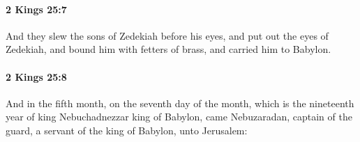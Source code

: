 		\paragraph{2 Kings 25:7} %
			\label{2KINGS-25-7}

			And they slew the sons of Zedekiah before his eyes, and put out the eyes of Zedekiah, and bound him with fetters of brass, and carried him to Babylon.


		\paragraph{2 Kings 25:8} %
			\label{2KINGS-25-8}

			And in the fifth month, on the seventh day of the month, which is the nineteenth year of king Nebuchadnezzar king of Babylon, came Nebuzaradan, captain of the guard, a servant of the king of Babylon, unto Jerusalem:


